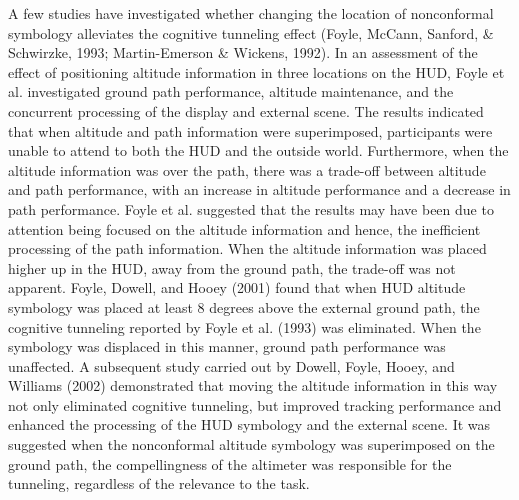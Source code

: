 \documentclass[utf8,bachelor,manualbib]{gradu3}
\begin{document}
A few studies have investigated whether changing the location of nonconformal
symbology alleviates the cognitive tunneling effect (Foyle, McCann, Sanford, \&
Schwirzke, 1993; Martin-Emerson \& Wickens, 1992). In an assessment of the
effect of positioning altitude information in three locations on the HUD, Foyle et
al. investigated ground path performance, altitude maintenance, and the concurrent
processing of the display and external scene. The results indicated that
when altitude and path information were superimposed, participants were unable
to attend to both the HUD and the outside world. Furthermore, when the altitude
information was over the path, there was a trade-off between altitude and path
performance, with an increase in altitude performance and a decrease in path
performance. Foyle et al. suggested that the results may have been due to attention
being focused on the altitude information and hence, the inefficient processing
of the path information. When the altitude information was placed higher up
in the HUD, away from the ground path, the trade-off was not apparent.
Foyle, Dowell, and Hooey (2001) found that when HUD altitude symbology
was placed at least 8 degrees above the external ground path, the cognitive tunneling reported
by Foyle et al. (1993) was eliminated. When the symbology was displaced
in this manner, ground path performance was unaffected. A subsequent
study carried out by Dowell, Foyle, Hooey, and Williams (2002) demonstrated
that moving the altitude information in this way not only eliminated cognitive
tunneling, but improved tracking performance and enhanced the processing of
the HUD symbology and the external scene. It was suggested when the
nonconformal altitude symbology was superimposed on the ground path, the
compellingness of the altimeter was responsible for the tunneling, regardless of
the relevance to the task. \citep{crawford2006}
\end{document}
